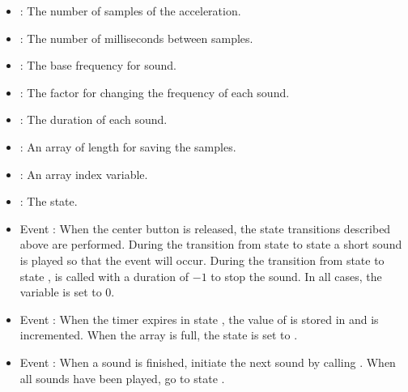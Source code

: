 
\begin{itemize}
\item {}: The number of samples of the acceleration.
\item {}: The number of milliseconds between samples.
\item {}: The base frequency for sound.
\item {}: The factor for changing the frequency of each sound.
\item {}: The duration of each sound.
\end{itemize}


\begin{itemize}
\item {}: An array of length  for saving the samples.
\item {}: An array index variable.
\item {}: The state.
\end{itemize}


\begin{itemize}

\item Event : When the center button is released,
the state transitions described above are performed.
During the transition from state  to state  a short
sound is played so that the event  will occur.
During the transition from state  to state ,
 is called with a duration of $-1$ to stop the sound.
In all cases, the variable  is set to 0.

\item Event : When the timer expires in state ,
the value of  is stored in  and  is incremented.
When the array is full, the state is set to .

\item Event : When a sound is finished,
initiate the next sound by calling . When all sounds
have been played, go to state .
\end{itemize}


